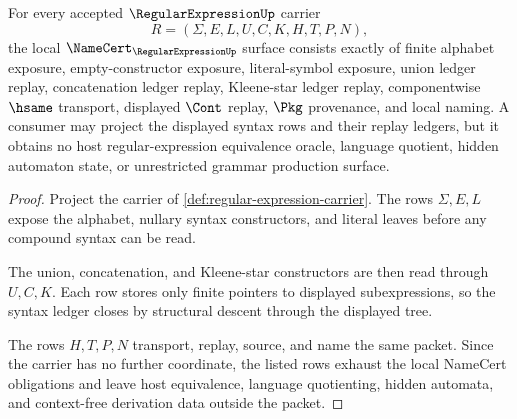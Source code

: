 \begin{theorem}
\label{thm:regular-expression-namecert-obligations}
For every accepted $\RegularExpressionUp$ carrier
$$
R=(\Sigma,E,L,U,C,K,H,T,P,N),
$$
the local $\NameCert_{\RegularExpressionUp}$ surface consists exactly of finite alphabet exposure, empty-constructor exposure, literal-symbol exposure, union ledger replay, concatenation ledger replay, Kleene-star ledger replay, componentwise $\hsame$ transport, displayed $\Cont$ replay, $\Pkg$ provenance, and local naming. A consumer may project the displayed syntax rows and their replay ledgers, but it obtains no host regular-expression equivalence oracle, language quotient, hidden automaton state, or unrestricted grammar production surface.
\end{theorem}
\begin{proof}
Project the carrier of \autoref{def:regular-expression-carrier}. The rows $\Sigma,E,L$ expose the alphabet, nullary syntax constructors, and literal leaves before any compound syntax can be read.

The union, concatenation, and Kleene-star constructors are then read through $U,C,K$. Each row stores only finite pointers to displayed subexpressions, so the syntax ledger closes by structural descent through the displayed tree.

The rows $H,T,P,N$ transport, replay, source, and name the same packet. Since the carrier has no further coordinate, the listed rows exhaust the local NameCert obligations and leave host equivalence, language quotienting, hidden automata, and context-free derivation data outside the packet.
\end{proof}

